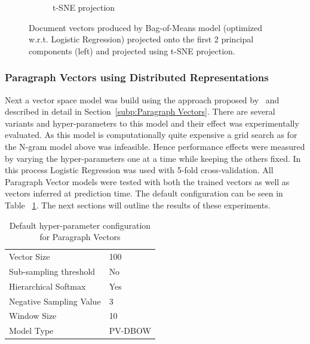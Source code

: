 \begin{figure}[h!]
\begin{subfigure}[b]{0.48\textwidth}
      \caption{t-SNE projection}
\label{fig:bom-tsne}
    \end{subfigure}
    \caption{Document vectors produced by Bag-of-Means model (optimized w.r.t. Logistic Regression) projected onto the first 2 principal components (left) and projected using t-SNE projection. }
\label{fig:bom}
\end{figure}

\subsubsection{Paragraph Vectors using Distributed Representations}
\label{subs:Paragraph Vectors using Distributed Representations}


Next a vector space model was build using the approach proposed by~\cite{Le:2014aa} and described in detail in Section~\ref{subp:Paragraph Vectors}. There are several variants and hyper-parameters to this model and their effect was experimentally evaluated. As this model is computationally quite expensive a grid search as for the N-gram model above was infeasible. Hence performance effects were measured by varying the hyper-parameters one at a time while keeping the others fixed. In this process Logistic Regression was used with 5-fold cross-validation. All Paragraph Vector models were tested with both the trained vectors as well as vectors inferred at prediction time. The default configuration can be seen in Table ~\ref{tab:Paragraph Vector Defaults}. The next sections will outline the results of these experiments.

\begin{table}[h]
  \begin{center}
  \begin{tabular}{ l | l }
    \toprule
    Vector Size & 100 \\
    Sub-sampling threshold & No \\
    Hierarchical Softmax & Yes \\
    Negative Sampling Value & 3 \\
    Window Size & 10 \\
    Model Type & PV-DBOW \\
    \bottomrule
  \end{tabular}
  \caption{Default hyper-parameter configuration for Paragraph Vectors}
  \label{tab:Paragraph Vector Defaults}
\end{center}
\end{table}


